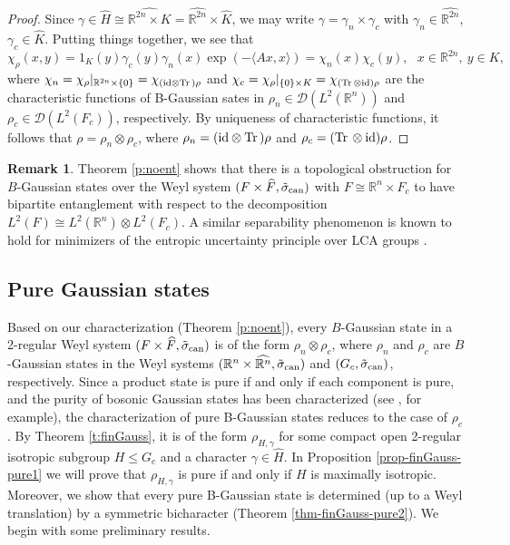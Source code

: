 \documentclass[12pt,reqno]{amsart}
\theoremstyle{definition}
\theoremstyle{definition}
\theoremstyle{definition}
\newtheorem{rem}[thm]{Remark}
\numberwithin{thm}{section}
\numberwithin{equation}{section}
\newcommand{\Real}{\mathbb R}
\newcommand{\la}{\langle}
\newcommand{\ra}{\rangle}
\newcommand{\D}{\mathcal{D}}
\newcommand{\tr}{{\rm Tr}\,}
\newcommand{\id}{{\rm id}}
\newcommand{\ten}{\otimes}
\newcommand{\wh}[1]{\widehat{#1}}
\newcommand{\tcr}[1]{\textcolor{red}{#1}}
\newcommand{\bR}{\mathbb{R}}
\begin{document}
\begin{proof}
Since $\gamma\in\wh{H}\cong \wh{\bR^{2n}\times K}=\wh{\bR^{2n}}\times\wh{K}$, we may write $\gamma=\gamma_n \times \gamma_c$ with $\gamma_n\in\wh{\bR^{2n}}$, $\gamma_c\in\wh{K}$. Putting things together, we see that
$$\chi_\rho(x,y)=1_K(y)\gamma_c(y)\gamma_n(x)\exp(-\la Ax,x\ra)=\chi_n(x)\chi_c(y), \ \ \ x\in\bR^{2n}, \ y\in K,$$
where $\chi_n=\chi_\rho|_{\bR^{2n}\times\{0\}}=\chi_{(\id\ten\tr)\rho}$ and $\chi_c=\chi_\rho|_{\{0\}\times K}=\chi_{(\tr\ten\id)\rho}$ are the characteristic functions of B-Gaussian sates in $\rho_n\in\D(L^2(\bR^{n}))$ and $\rho_c\in\D(L^2(F_c))$, respectively. By uniqueness of characteristic functions, it follows that $\rho=\rho_n\ten\rho_c$, where $\rho_n=(\id\ten\tr)\rho$ and $\rho_c=(\tr\ten\id)\rho$. 
\end{proof}

\begin{rem}
Theorem \ref{p:noent} shows that there is a topological obstruction for $B$-Gaussian states over the Weyl system $(F\times\widehat{F}, \tilde{\sigma}_{\rm can})$ with $F \cong \Real^n \times F_c$ to have bipartite entanglement with respect to the decomposition $L^2(F)\cong L^2(\bR^n)\ten L^2(F_c)$. A similar separability phenomenon is known to hold for minimizers of the entropic uncertainty principle over LCA groups \cite{OP}.
\end{rem}





\subsection{Pure Gaussian states} \label{sec-pureGaussian}

Based on our characterization (Theorem \ref{p:noent}), every $B$-Gaussian state in a 2-regular Weyl system $(F\times\widehat{F}, \tilde{\sigma}_{\rm can})$ is of the form $\rho_n\ten \rho_c$, where $\rho_n$ and $\rho_c$ are $B$-Gaussian states in the Weyl systems $(\bR^n\times\widehat{\bR^n}, \tilde{\sigma}_{\rm can})$ and $(G_c, \tilde{\sigma}_{\rm can})$, respectively.
Since a product state is pure if and only if each component is pure, and the purity of bosonic Gaussian states has been characterized (see \cite[Section 3]{AGI07}, for example), the characterization of pure B-Gaussian states reduces to the case of $\rho_c$. By Theorem \ref{t:finGauss}, it is of the form $\rho_{H,\gamma}$ for some compact open 2-regular isotropic subgroup $H\leq G_c$ and a character $\gamma\in\widehat{H}$. In Proposition \ref{prop-finGauss-pure1} we will prove that $\rho_{H,\gamma}$ is pure if and only if $H$ is maximally isotropic. Moreover, we show that every pure B-Gaussian state is determined (up to a Weyl translation) by a symmetric bicharacter (Theorem \ref{thm-finGauss-pure2}). We begin with some preliminary results.
\end{document}
